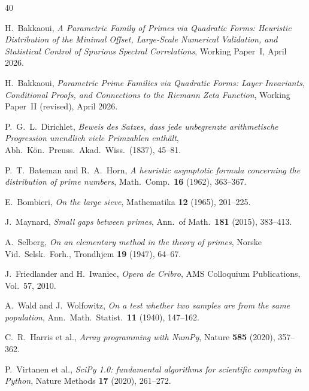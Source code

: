 \documentclass[11pt,a4paper]{article}
\theoremstyle{plain}
\theoremstyle{definition}
\begin{document}
\begin{thebibliography}{40}

 H.~Bakkaoui, \textit{A Parametric Family of Primes via Quadratic
Forms: Heuristic Distribution of the Minimal Offset, Large-Scale Numerical
Validation, and Statistical Control of Spurious Spectral Correlations}, Working
Paper~I, April 2026.

 H.~Bakkaoui, \textit{Parametric Prime Families via Quadratic
Forms: Layer Invariants, Conditional Proofs, and Connections to the Riemann
Zeta Function}, Working Paper~II (revised), April 2026.

 P.~G.~L.~Dirichlet, \textit{Beweis des Satzes, dass jede
unbegrenzte arithmetische Progression unendlich viele Primzahlen enth\"alt},
Abh.\ K\"on.\ Preuss.\ Akad.\ Wiss.\ (1837), 45--81.

 P.~T.~Bateman and R.~A.~Horn, \textit{A heuristic
asymptotic formula concerning the distribution of prime numbers}, Math.\ Comp.\
\textbf{16} (1962), 363--367.

 E.~Bombieri, \textit{On the large sieve}, Mathematika
\textbf{12} (1965), 201--225.

 J.~Maynard, \textit{Small gaps between primes}, Ann.\ of
Math.\ \textbf{181} (2015), 383--413.

 A.~Selberg, \textit{On an elementary method in the theory of
primes}, Norske Vid.\ Selsk.\ Forh., Trondhjem \textbf{19} (1947), 64--67.

 J.~Friedlander and H.~Iwaniec, \textit{Opera de Cribro},
AMS Colloquium Publications, Vol.~57, 2010.

 A.~Wald and J.~Wolfowitz, \textit{On a test whether two samples
are from the same population}, Ann.\ Math.\ Statist.\ \textbf{11} (1940),
147--162.

 C.~R.~Harris et al., \textit{Array programming with NumPy},
Nature \textbf{585} (2020), 357--362.

 P.~Virtanen et al., \textit{SciPy 1.0: fundamental algorithms
for scientific computing in Python}, Nature Methods \textbf{17} (2020), 261--272.

\end{thebibliography}
\end{document}
